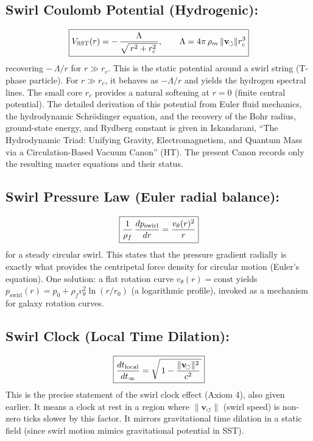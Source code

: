 \documentclass[10pt,reprint,aps,onecolumn,nofootinbib]{revtex4-2}
\newcommand{\vswirl}{\mathbf{v}_{\!\boldsymbol{\circlearrowleft}}}
\begin{document}
        \subsection{Swirl Coulomb Potential (Hydrogenic):}
            \[
                \boxed{%
                    V_{\text{SST}}(r) = -\,\frac{\Lambda}{\sqrt{\,r^2 + r_c^2\,}}, \qquad
                    \Lambda = 4\pi\,\rho_m\,\lVert \mathbf{v}_{\!\boldsymbol{\circlearrowleft}}\rVert r_c^{3}
                }
            \]
            \label{eq:swirl-coulomb-potential}
            recovering $-\,\Lambda/r$ for $r \gg r_c$. This is the static potential around a swirl string (T-phase particle). For $r \gg r_c$, it behaves as $-\Lambda/r$ and yields the hydrogen spectral lines. The small core $r_c$ provides a natural softening at $r=0$ (finite central potential). The detailed derivation of this potential from Euler fluid mechanics, the hydrodynamic Schrödinger equation, and the recovery of the Bohr radius, ground-state energy, and Rydberg constant is given in Iskandarani, ``The Hydrodynamic Triad: Unifying Gravity, Electromagnetism, and Quantum Mass via a Circulation-Based Vacuum Canon'' (HT). The present Canon records only the resulting master equations and their status.

        \subsection{Swirl Pressure Law (Euler radial balance):}
            \[
                \boxed{%
                    \frac{1}{\rho_f}\,\frac{d p_{\text{swirl}}}{dr} = \frac{v_{\theta}(r)^2}{r}
                }
            \]
            \label{eq:swirl-pressure-law}
            for a steady circular swirl. This states that the pressure gradient radially is exactly what provides the centripetal force density for circular motion (Euler’s equation). One solution: a flat rotation curve $v_{\theta}(r)=\text{const}$ yields $p_{\text{swirl}}(r) = p_0 + \rho_f v_{\theta}^2 \ln(r/r_0)$ (a logarithmic profile), invoked as a mechanism for galaxy rotation curves.

        \subsection{Swirl Clock (Local Time Dilation):}
            \[
                \boxed{%
                    \frac{dt_{\text{local}}}{dt_{\infty}} = \sqrt{\,1 - \frac{\|\vswirl\|^2}{c^2}\,}
                }
            \]
            This is the precise statement of the swirl clock effect (Axiom 4), also given earlier. It means a clock at rest in a region where $\|\vswirl\|$ (swirl speed) is non-zero ticks slower by this factor. It mirrors gravitational time dilation in a static field (since swirl motion mimics gravitational potential in SST).
\end{document}
